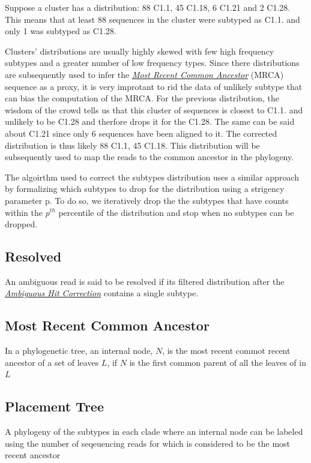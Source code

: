 \documentclass[letterpaper,10pt,english]{sphinxmanual}
\begin{document}
Suppose a cluster has a distribution:
88 C1.1, 45 C1.18, 6 C1.21 and 2 C1.28. This means that at least 88 sequences in the cluster were subtyped as C1.1. and only 1
was subtyped as C1.28.

Clusters' distributions are usually highly skewed with few high
frequency subtypes and a greater number of low frequency types.  Since
there distributions are subsequently used to infer the {\hyperref[defs:mrca]{\emph{Most Recent Common Ancestor}}}
(MRCA) sequence as a proxy, it is very improtant to rid the data of
unlikely subtype that can bias the computation of the MRCA. For the
previous distribution, the wisdom of the crowd tells us that this
cluster of sequences is closest to C1.1. and unlikely to be C1.28 and
therfore drops it for the C1.28. The same can be said about C1.21
since only 6 sequences have been aligned to it.  The corrected
distribution is thus likely 88 C1.1, 45 C1.18. This distribution will
be subsequently used to map the reads to the common ancestor in the
phylogeny.

The algoirthm used to correct the subtypes distribution uses a similar
approach by formalizing which subtypes to drop for the distribution
using a strigency parameter p. To do so, we iteratively drop the
the subtypes that have counts within the \(p^{th}\) percentile of the distribution and stop
when no subtypes can be dropped.


\subsection{Resolved}
\label{defs:resolved}\label{defs:id9}
An ambiguous read is said to be resolved if its filtered distribution after the {\hyperref[defs:multiple-hits]{\emph{Ambiguous Hit Correction}}} contains a single subtype.


\subsection{Most Recent Common Ancestor}
\label{defs:mrca}\label{defs:most-recent-common-ancestor}
In a phylogenetic tree, an internal node, \(N\), is the most recent commot recent ancestor of a set of leaves \(L\), if \(N\) is the first common parent
of all the leaves of in \(L\)


\subsection{Placement Tree}
\label{defs:placement-tree}
A phylogeny of the subtypes in each clade where an internal node can be labeled using the number of seqeuencing reads for which is considered to be the most recent ancestor
\end{document}
